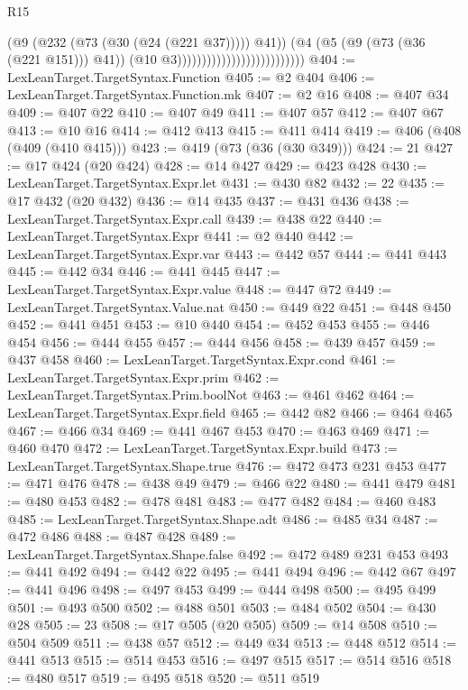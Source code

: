 \begin{lexlean}{R15}
\begin{coremodule}
                                                      (@9 (@232 (@73 (@30 (@24 (@221 @37))))) @41))
                                                    (@4
                                                      (@5 (@9 (@73 (@36 (@221 @151))) @41))
                                                      (@10 @3))))))))))))))))))))))))))
@404 := LexLeanTarget.TargetSyntax.Function
@405 := @2 @404
@406 := LexLeanTarget.TargetSyntax.Function.mk
@407 := @2 @16
@408 := @407 @34
@409 := @407 @22
@410 := @407 @49
@411 := @407 @57
@412 := @407 @67
@413 := @10 @16
@414 := @412 @413
@415 := @411 @414
@419 := @406 (@408 (@409 (@410 @415)))
@423 := @419 (@73 (@36 (@30 @349)))
@424 := 21
@427 := @17 @424 (@20 @424)
@428 := @14 @427
@429 := @423 @428
@430 := LexLeanTarget.TargetSyntax.Expr.let
@431 := @430 @82
@432 := 22
@435 := @17 @432 (@20 @432)
@436 := @14 @435
@437 := @431 @436
@438 := LexLeanTarget.TargetSyntax.Expr.call
@439 := @438 @22
@440 := LexLeanTarget.TargetSyntax.Expr
@441 := @2 @440
@442 := LexLeanTarget.TargetSyntax.Expr.var
@443 := @442 @57
@444 := @441 @443
@445 := @442 @34
@446 := @441 @445
@447 := LexLeanTarget.TargetSyntax.Expr.value
@448 := @447 @72
@449 := LexLeanTarget.TargetSyntax.Value.nat
@450 := @449 @22
@451 := @448 @450
@452 := @441 @451
@453 := @10 @440
@454 := @452 @453
@455 := @446 @454
@456 := @444 @455
@457 := @444 @456
@458 := @439 @457
@459 := @437 @458
@460 := LexLeanTarget.TargetSyntax.Expr.cond
@461 := LexLeanTarget.TargetSyntax.Expr.prim
@462 := LexLeanTarget.TargetSyntax.Prim.boolNot
@463 := @461 @462
@464 := LexLeanTarget.TargetSyntax.Expr.field
@465 := @442 @82
@466 := @464 @465
@467 := @466 @34
@469 := @441 @467 @453
@470 := @463 @469
@471 := @460 @470
@472 := LexLeanTarget.TargetSyntax.Expr.build
@473 := LexLeanTarget.TargetSyntax.Shape.true
@476 := @472 @473 @231 @453
@477 := @471 @476
@478 := @438 @49
@479 := @466 @22
@480 := @441 @479
@481 := @480 @453
@482 := @478 @481
@483 := @477 @482
@484 := @460 @483
@485 := LexLeanTarget.TargetSyntax.Shape.adt
@486 := @485 @34
@487 := @472 @486
@488 := @487 @428
@489 := LexLeanTarget.TargetSyntax.Shape.false
@492 := @472 @489 @231 @453
@493 := @441 @492
@494 := @442 @22
@495 := @441 @494
@496 := @442 @67
@497 := @441 @496
@498 := @497 @453
@499 := @444 @498
@500 := @495 @499
@501 := @493 @500
@502 := @488 @501
@503 := @484 @502
@504 := @430 @28
@505 := 23
@508 := @17 @505 (@20 @505)
@509 := @14 @508
@510 := @504 @509
@511 := @438 @57
@512 := @449 @34
@513 := @448 @512
@514 := @441 @513
@515 := @514 @453
@516 := @497 @515
@517 := @514 @516
@518 := @480 @517
@519 := @495 @518
@520 := @511 @519

\end{coremodule}
\end{lexlean}
